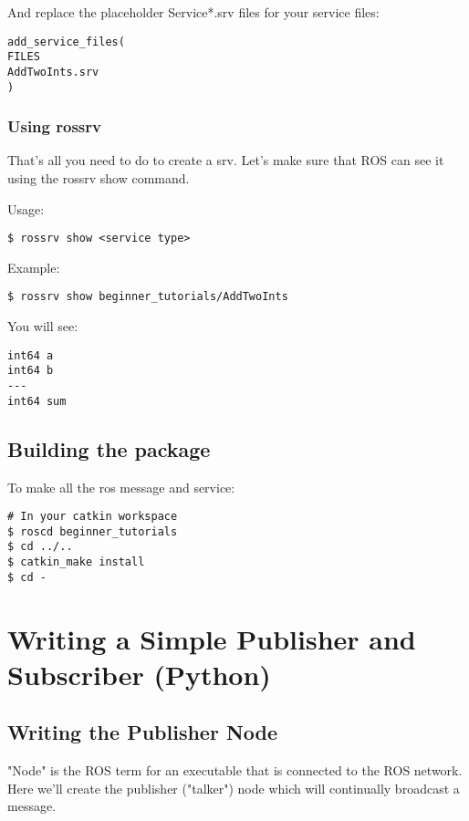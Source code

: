And replace the placeholder Service*.srv files for your service files:
\begin{lstlisting}[breaklines=true languages=bash]
add_service_files(
FILES
AddTwoInts.srv
)
\end{lstlisting}

\subsubsection{Using rossrv}
That's all you need to do to create a srv. Let's make sure that ROS can see it using the rossrv show command.

Usage:
\begin{lstlisting}[breaklines=true languages=bash]
$ rossrv show <service type>
\end{lstlisting}

Example:

\begin{lstlisting}[breaklines=true languages=bash]
$ rossrv show beginner_tutorials/AddTwoInts
\end{lstlisting}

You will see:
\begin{lstlisting}[breaklines=true languages=bash]
int64 a
int64 b
---
int64 sum
\end{lstlisting}

\subsection{Building the package}

To make all the ros message and service:
\begin{lstlisting}[breaklines=true languages=bash]
# In your catkin workspace
$ roscd beginner_tutorials
$ cd ../..
$ catkin_make install
$ cd -
\end{lstlisting}

\section{Writing a Simple Publisher and Subscriber (Python)}

\subsection{Writing the Publisher Node}
"Node" is the ROS term for an executable that is connected to the ROS network. Here we'll create the publisher ("talker") node which will continually broadcast a message.

